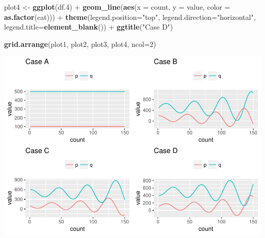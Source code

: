 \documentclass[]{article}
\newenvironment{Shaded}{\begin{snugshade}}{\end{snugshade}}
\newcommand{\KeywordTok}[1]{\textcolor[rgb]{0.13,0.29,0.53}{\textbf{{#1}}}}
\newcommand{\DataTypeTok}[1]{\textcolor[rgb]{0.13,0.29,0.53}{{#1}}}
\newcommand{\DecValTok}[1]{\textcolor[rgb]{0.00,0.00,0.81}{{#1}}}
\newcommand{\FloatTok}[1]{\textcolor[rgb]{0.00,0.00,0.81}{{#1}}}
\newcommand{\StringTok}[1]{\textcolor[rgb]{0.31,0.60,0.02}{{#1}}}
\newcommand{\NormalTok}[1]{{#1}}
\begin{document}
\begin{Shaded}
\begin{Highlighting}[]
\NormalTok{plot4 <-}\StringTok{ }\KeywordTok{ggplot}\NormalTok{(df}\FloatTok{.4}\NormalTok{) +}\StringTok{ }
\StringTok{         }\KeywordTok{geom_line}\NormalTok{(}\KeywordTok{aes}\NormalTok{(}\DataTypeTok{x =} \NormalTok{count, }\DataTypeTok{y =} \NormalTok{value, }\DataTypeTok{color =} \KeywordTok{as.factor}\NormalTok{(cat))) +}\StringTok{ }
\StringTok{         }\KeywordTok{theme}\NormalTok{(}\DataTypeTok{legend.position=}\StringTok{"top"}\NormalTok{, }\DataTypeTok{legend.direction=}\StringTok{"horizontal"}\NormalTok{, }\DataTypeTok{legend.title=}\KeywordTok{element_blank}\NormalTok{()) +}
\StringTok{         }\KeywordTok{ggtitle}\NormalTok{(}\StringTok{"Case D"}\NormalTok{)}

\KeywordTok{grid.arrange}\NormalTok{(plot1, plot2, plot3, plot4, }\DataTypeTok{ncol=}\DecValTok{2}\NormalTok{)}
\end{Highlighting}
\end{Shaded}

\includegraphics{CHunt_homework1_files/figure-latex/unnamed-chunk-6-1.pdf}
\end{document}
